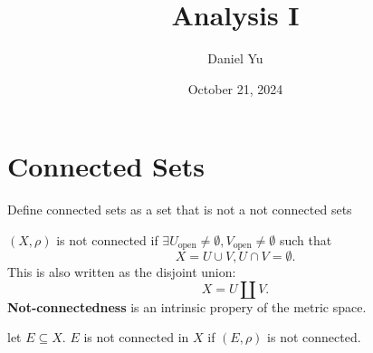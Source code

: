 \documentclass[a4paper]{article}
\title{\Huge{Analysis I}}
\author{\huge{Daniel Yu}}
\date{October 21, 2024}
\begin{document}
\maketitle
\newpage%
\tableofcontents
\pagebreak
  
\section{Connected Sets}
Define connected sets as a set that is not a not connected sets
\begin{definition}
  $\left( X, \rho \right) $ is not connected if  $\exists U_{\text{open}} \neq \emptyset, V_{\text{open}} \neq \emptyset$ such that
  \[
  X = U \cup V, U \cap V = \emptyset
  .\] 
  This is also written as the disjoint union:
  \[
  X = U \amalg V
  .\] 
  \textbf{Not-connectedness} is an intrinsic propery of the metric space.
\end{definition}

\begin{definition}
  let $E \subseteq X$.  $E$ is not connected in $X$ if  $\left( E, \rho \right) $ is not connected.
\end{definition}
\end{document}
